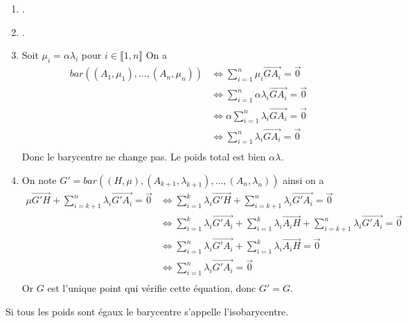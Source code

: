 \documentclass[a4paper, 12pt]{article}
\begin{document}
\begin{demonstration}
    \begin{enumerate}[label=\roman*.]
        \item.
        \item.
        \item Soit $\mu_i = \alpha \lambda_i$ pour $i \in \llbracket 1, n \rrbracket$
        On a
        \begin{align*}
            bar((A_1, \mu_1), \ldots, (A_n, \mu_n)) &\iff \sum_{i=1}^n \mu_i \overrightarrow{G A_i} = \vec{0} \\
            &\iff \sum_{i=1}^n \alpha \lambda_i \overrightarrow{G A_i} = \vec{0} \\
            &\iff \alpha \sum_{i=1}^n \lambda_i \overrightarrow{G A_i} = \vec{0} \\
            &\iff \sum_{i=1}^n \lambda_i \overrightarrow{G A_i} = \vec{0} \\
        \end{align*}
        Donc le barycentre ne change pas. Le poids total est bien $\alpha \lambda$.
        \item 
        On note $G' = bar((H, \mu), (A_{k+1}, \lambda_{k+1}), \ldots, (A_n, \lambda_n))$
        ainsi on a
        \begin{align*}
            \mu \overrightarrow{G'H} + \sum_{i=k+1}^n \lambda_i \overrightarrow{G'A_i} = \vec{0} &\iff \sum_{i=1}^k \lambda_i \overrightarrow{G'H} + \sum_{i=k+1}^n \lambda_i \overrightarrow{G'A_i} = \vec{0} \\
            &\iff \sum_{i=1}^k \lambda_i \overrightarrow{G' A_i} + \sum_{i=1}^k \lambda_i \overrightarrow{A_i H} + \sum_{i=k+1}^n \lambda_i \overrightarrow{G'A_i} = \vec{0} \\
            &\iff \sum_{i=1}^n \lambda_i \overrightarrow{G'A_i} + \sum_{i=1}^k \lambda_i \overrightarrow{A_i H} = \vec{0} \\
            &\iff \sum_{i=1}^n \lambda_i \overrightarrow{G'A_i} = \vec{0} \\
        \end{align*}
        Or $G$ est l'unique point qui vérifie cette équation, donc $G' = G$.
    \end{enumerate}
\end{demonstration}

\begin{definition}
    Si tous les poids sont égaux le barycentre s'appelle l'isobarycentre.
\end{definition}
\end{document}
